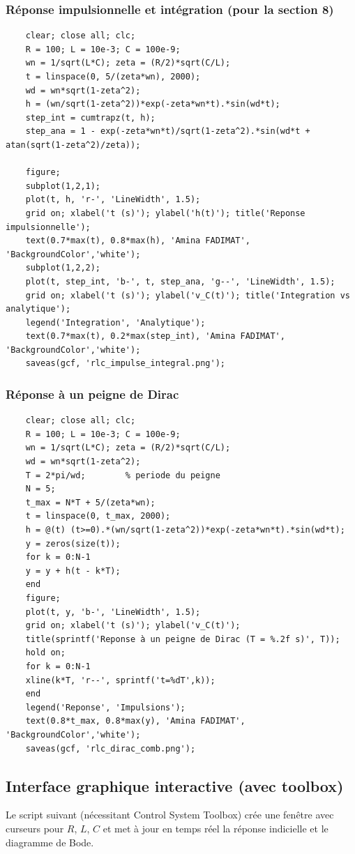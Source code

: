 \documentclass[12pt,a4paper]{article}
\begin{document}
	\subsubsection{Réponse impulsionnelle et intégration (pour la section 8)}
	\begin{lstlisting}[caption=Impulsion et intégration]
	%% Impulsion et intégration (RLC)
	clear; close all; clc;
	R = 100; L = 10e-3; C = 100e-9;
	wn = 1/sqrt(L*C); zeta = (R/2)*sqrt(C/L);
	t = linspace(0, 5/(zeta*wn), 2000);
	wd = wn*sqrt(1-zeta^2);
	h = (wn/sqrt(1-zeta^2))*exp(-zeta*wn*t).*sin(wd*t);
	step_int = cumtrapz(t, h);
	step_ana = 1 - exp(-zeta*wn*t)/sqrt(1-zeta^2).*sin(wd*t + atan(sqrt(1-zeta^2)/zeta));
	
	figure;
	subplot(1,2,1);
	plot(t, h, 'r-', 'LineWidth', 1.5);
	grid on; xlabel('t (s)'); ylabel('h(t)'); title('Reponse impulsionnelle');
	text(0.7*max(t), 0.8*max(h), 'Amina FADIMAT', 'BackgroundColor','white');
	subplot(1,2,2);
	plot(t, step_int, 'b-', t, step_ana, 'g--', 'LineWidth', 1.5);
	grid on; xlabel('t (s)'); ylabel('v_C(t)'); title('Integration vs analytique');
	legend('Integration', 'Analytique');
	text(0.7*max(t), 0.2*max(step_int), 'Amina FADIMAT', 'BackgroundColor','white');
	saveas(gcf, 'rlc_impulse_integral.png');
	\end{lstlisting}
	
	\subsubsection{Réponse à un peigne de Dirac}
	\begin{lstlisting}[caption=Peigne de Dirac pour RLC]
	%% Reponse à un peigne de Dirac (RLC)
	clear; close all; clc;
	R = 100; L = 10e-3; C = 100e-9;
	wn = 1/sqrt(L*C); zeta = (R/2)*sqrt(C/L);
	wd = wn*sqrt(1-zeta^2);
	T = 2*pi/wd;        % periode du peigne
	N = 5;
	t_max = N*T + 5/(zeta*wn);
	t = linspace(0, t_max, 2000);
	h = @(t) (t>=0).*(wn/sqrt(1-zeta^2))*exp(-zeta*wn*t).*sin(wd*t);
	y = zeros(size(t));
	for k = 0:N-1
	y = y + h(t - k*T);
	end
	figure;
	plot(t, y, 'b-', 'LineWidth', 1.5);
	grid on; xlabel('t (s)'); ylabel('v_C(t)');
	title(sprintf('Reponse à un peigne de Dirac (T = %.2f s)', T));
	hold on;
	for k = 0:N-1
	xline(k*T, 'r--', sprintf('t=%dT',k));
	end
	legend('Reponse', 'Impulsions');
	text(0.8*t_max, 0.8*max(y), 'Amina FADIMAT', 'BackgroundColor','white');
	saveas(gcf, 'rlc_dirac_comb.png');
	\end{lstlisting}
	
	\subsection{Interface graphique interactive (avec toolbox)}
	Le script suivant (nécessitant Control System Toolbox) crée une fenêtre avec curseurs pour $R$, $L$, $C$ et met à jour en temps réel la réponse indicielle et le diagramme de Bode.
	
\end{document}
